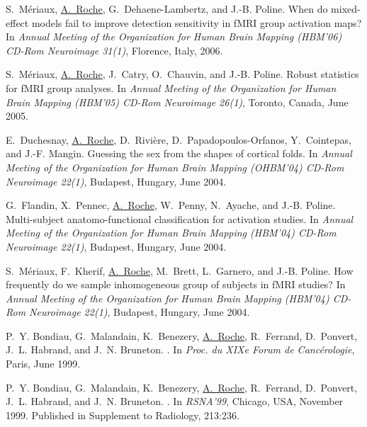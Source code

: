\begin{thebibliography}{100}
S.~M\'eriaux, \underline{A.~Roche}, G.~Dehaene-Lambertz, and J.-B. Poline.
\newblock When do mixed-effect models fail to improve detection sensitivity in
  f{MRI} group activation maps?
\newblock In {\em Annual Meeting of the Organization for Human Brain Mapping
  (HBM'06) CD-Rom Neuroimage 31(1)}, Florence, Italy, 2006.

S.~M\'eriaux, \underline{A.~Roche}, J.~Catry, O.~Chauvin, and J.-B. Poline.
\newblock Robust statistics for f{MRI} group analyses.
\newblock In {\em Annual Meeting of the Organization for Human Brain Mapping
  (HBM'05) CD-Rom Neuroimage 26(1)}, Toronto, Canada, June 2005.

E.~Duchesnay, \underline{A.~Roche}, D.~Rivi\`ere, D.~Papadopoulos-Orfanos, Y.~Cointepas,
  and J.-F. Mangin.
\newblock Guessing the sex from the shapes of cortical folds.
\newblock In {\em Annual Meeting of the Organization for Human Brain Mapping
  (OHBM'04) CD-Rom Neuroimage 22(1)}, Budapest, Hungary, June 2004.

G.~Flandin, X.~Pennec, \underline{A.~Roche}, W.~Penny, N.~Ayache, and J.-B. Poline.
\newblock Multi-subject anatomo-functional classification for activation
  studies.
\newblock In {\em Annual Meeting of the Organization for Human Brain Mapping
  (HBM'04) CD-Rom Neuroimage 22(1)}, Budapest, Hungary, June 2004.

S.~M\'eriaux, F.~Kherif, \underline{A.~Roche}, M.~Brett, L.~Garnero, and J.-B. Poline.
\newblock How frequently do we sample inhomogeneous group of subjects in f{MRI}
  studies?
\newblock In {\em Annual Meeting of the Organization for Human Brain Mapping
  (HBM'04) CD-Rom Neuroimage 22(1)}, Budapest, Hungary, June 2004.

P.~Y. Bondiau, G.~Malandain, K.~Benezery, \underline{A.~Roche}, R.~Ferrand, D.~Ponvert,
  J.~L. Habrand, and J.~N. Bruneton.
.
\newblock In {\em {Proc. du XIXe Forum de Canc\'erologie}}, Paris, June 1999.

P.~Y. Bondiau, G.~Malandain, K.~Benezery, \underline{A.~Roche}, R.~Ferrand, D.~Ponvert,
  J.~L. Habrand, and J.~N. Bruneton.
.
\newblock In {\em {RSNA'99}}, Chicago, USA, November 1999. Published in
  Supplement to Radiology, 213:236.


\end{thebibliography}
